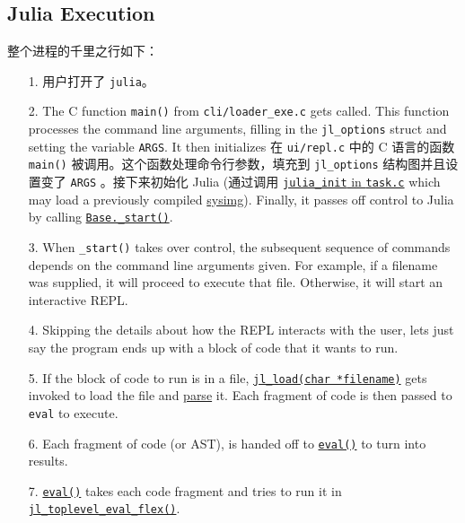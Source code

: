 \subsection{Julia Execution}



整个进程的千里之行如下：



\begin{itemize}
\item[1.  ] 用户打开了 \texttt{julia}。


\item[2.  ] The C function \texttt{main()} from \texttt{cli/loader\_exe.c} gets called. This function processes the command line arguments, filling in the \texttt{jl\_options} struct and setting the variable \texttt{ARGS}. It then initializes 在 \texttt{ui/repl.c} 中的 C 语言的函数 \texttt{main()} 被调用。这个函数处理命令行参数，填充到 \texttt{jl\_options} 结构图并且设置变了 \texttt{ARGS} 。接下来初始化 Julia (通过调用  \href{https://github.com/JuliaLang/julia/blob/master/src/task.c}{\texttt{julia\_init} in \texttt{task.c}} which may load a previously compiled \hyperlink{6082338945993475185}{sysimg}). Finally, it passes off control to Julia by calling \href{https://github.com/JuliaLang/julia/blob/master/base/client.jl}{\texttt{Base.\_start()}}.


\item[3.  ] When \texttt{\_start()} takes over control, the subsequent sequence of commands depends on the command line arguments given. For example, if a filename was supplied, it will proceed to execute that file. Otherwise, it will start an interactive REPL.


\item[4.  ] Skipping the details about how the REPL interacts with the user, let{\textquotesingle}s just say the program ends up with a block of code that it wants to run.


\item[5.  ] If the block of code to run is in a file, \href{https://github.com/JuliaLang/julia/blob/master/src/toplevel.c}{\texttt{jl\_load(char *filename)}} gets invoked to load the file and \hyperlink{14838640034628506824}{parse} it. Each fragment of code is then passed to \texttt{eval} to execute.


\item[6.  ] Each fragment of code (or AST), is handed off to \hyperlink{7507639810592563424}{\texttt{eval()}} to turn into results.


\item[7.  ] \hyperlink{7507639810592563424}{\texttt{eval()}} takes each code fragment and tries to run it in \href{https://github.com/JuliaLang/julia/blob/master/src/toplevel.c}{\texttt{jl\_toplevel\_eval\_flex()}}.



\end{itemize}
